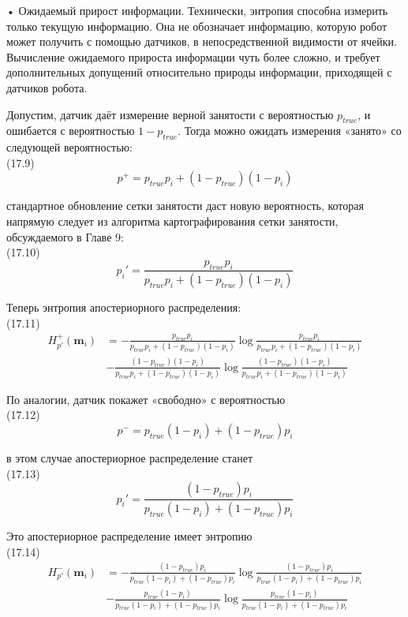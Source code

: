 \documentclass[10pt,a4paper]{article}
\begin{document}
•	Ожидаемый прирост информации. Технически, энтропия способна измерить только текущую информацию. Она не обозначает информацию, которую робот может получить с помощью датчиков, в непосредственной видимости от ячейки. Вычисление ожидаемого прироста информации чуть более сложно, и требует дополнительных допущений относительно природы информации, приходящей с датчиков робота.

Допустим, датчик даёт измерение верной занятости с вероятностью $p_{true}$, и ошибается с вероятностью $1-p_{true}$. Тогда можно ожидать измерения «занято» со следующей вероятностью:\\

(17.9)
$$p^+=p_{true}p_i+(1-p_{true})(1-p_i)$$

стандартное обновление сетки занятости даст новую вероятность, которая напрямую следует из алгоритма картографирования сетки занятости, обсуждаемого в Главе 9:\\

(17.10)
$$p_i'=\frac{p_{true}p_i}{p_{true}p_i+(1-p_{true})(1-p_i)}$$

Теперь энтропия апостериорного распределения:\\

(17.11)
\begin{equation*}
\begin{split}
H_{p'}^+(\textbf{m}_i)&=-\frac{p_{true}p_i}{p_{true}p_i+(1-p_{true})(1-p_i)}\log\frac{p_{true}p_i}{p_{true}p_i+(1-p_{true})(1-p_i)}\\
&-\frac{(1-p_{true})(1-p_i)}{p_{true}p_i+(1-p_{true})(1-p_i)}\log\frac{(1-p_{true})(1-p_i)}{p_{true}p_i+(1-p_{true})(1-p_i)}
\end{split}
\end{equation*}

По аналогии, датчик покажет «свободно» с вероятностью\\

(17.12)
$$p^-=p_{true}(1-p_i)+(1-p_{true})p_i$$

в этом случае апостериорное распределение станет\\

(17.13)
$$p_i'=\frac{(1-p_{true})p_i}{p_{true}(1-p_i)+(1-p_{true})p_i}$$

Это апостериорное распределение имеет энтропию\\

(17.14)
\begin{equation*}
\begin{split}
H_{p'}^-(\textbf{m}_i)&=-\frac{(1-p_{true})p_i}{p_{true}(1-p_i)+(1-p_{true})p_i}\log\frac{(1-p_{true})p_i}{p_{true}(1-p_i)+(1-p_{true})p_i}\\
&-\frac{p_{true}(1-p_i)}{p_{true}(1-p_i)+(1-p_{true})p_i}\log\frac{p_{true}(1-p_i)}{p_{true}(1-p_i)+(1-p_{true})p_i}
\end{split}
\end{equation*}
\end{document}
